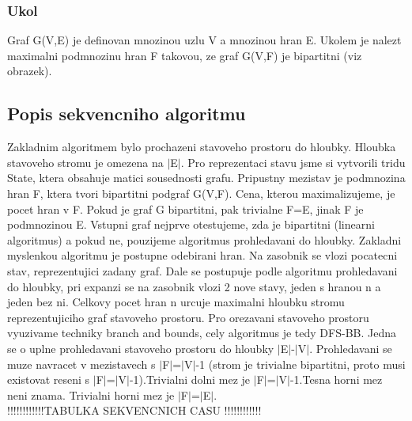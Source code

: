 \subsubsection{Ukol}

Graf G(V,E) je definovan mnozinou uzlu V a mnozinou hran E. Ukolem je nalezt maximalni podmnozinu hran F takovou, ze graf G(V,F) je bipartitni (viz obrazek).

\subsection{Popis sekvencniho algoritmu}
Zakladnim algoritmem bylo prochazeni stavoveho prostoru do hloubky. Hloubka stavoveho stromu je omezena na $|$E$|$. Pro reprezentaci stavu jsme si vytvorili tridu State, ktera obsahuje matici sousednosti grafu. Pripustny mezistav je podmnozina hran F, ktera tvori bipartitni podgraf G(V,F). Cena, kterou maximalizujeme, je pocet hran v F. Pokud je graf G bipartitni, pak trivialne F=E, jinak F je podmnozinou E. Vstupni graf nejprve otestujeme, zda je bipartitni (linearni algoritmus) a pokud ne, pouzijeme algoritmus prohledavani do hloubky. Zakladni myslenkou algoritmu je postupne odebirani hran. Na zasobnik se vlozi pocatecni stav, reprezentujici zadany graf. Dale se postupuje podle algoritmu prohledavani do hloubky, pri expanzi se na zasobnik vlozi 2 nove stavy, jeden s hranou n a jeden bez ni. Celkovy pocet hran n urcuje maximalni hloubku stromu reprezentujiciho graf stavoveho prostoru. Pro orezavani stavoveho prostoru vyuzivame techniky branch and bounds, cely algoritmus je tedy DFS-BB. Jedna se o uplne prohledavani stavoveho prostoru do hloubky $|$E$|$-$|$V$|$. Prohledavani se muze navracet v mezistavech s $|$F$|$=$|$V$|$-1 (strom je trivialne bipartitni, proto musi existovat reseni s $|$F$|$=$|$V$|$-1).Trivialni dolni mez je $|$F$|$=$|$V$|$-1.Tesna horni mez neni znama. Trivialni horni mez je $|$F$|$=$|$E$|$. \\


!!!!!!!!!!!!TABULKA SEKVENCNICH CASU !!!!!!!!!!!!\\



